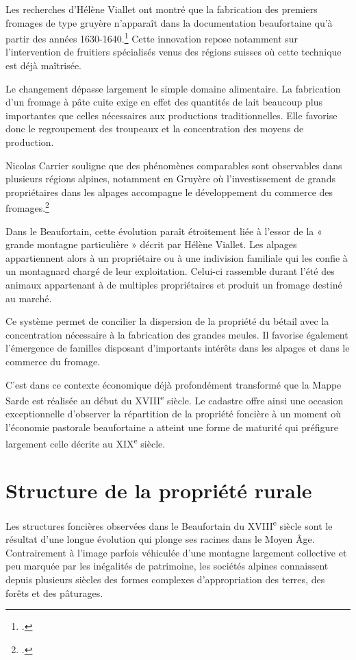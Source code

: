 \documentclass[12pt,a4paper]{report}
\begin{document}
Les recherches d'Hélène Viallet ont montré que la fabrication des premiers fromages de type gruyère n'apparaît dans la documentation beaufortaine qu'à partir des années 1630-1640.\footcite[96]{HViallet1993} Cette innovation repose notamment sur l'intervention de fruitiers spécialisés venus des régions suisses où cette technique est déjà maîtrisée.

Le changement dépasse largement le simple domaine alimentaire. La fabrication d'un fromage à pâte cuite exige en effet des quantités de lait beaucoup plus importantes que celles nécessaires aux productions traditionnelles. Elle favorise donc le regroupement des troupeaux et la concentration des moyens de production.

Nicolas Carrier souligne que des phénomènes comparables sont observables dans plusieurs régions alpines, notamment en Gruyère où l'investissement de grands propriétaires dans les alpages accompagne le développement du commerce des fromages.\footcite[287]{CarrierMouthon2010PaysansAlpes}

Dans le Beaufortain, cette évolution paraît étroitement liée à l'essor de la « grande montagne particulière » décrit par Hélène Viallet. Les alpages appartiennent alors à un propriétaire ou à une indivision familiale qui les confie à un montagnard chargé de leur exploitation. Celui-ci rassemble durant l'été des animaux appartenant à de multiples propriétaires et produit un fromage destiné au marché.

Ce système permet de concilier la dispersion de la propriété du bétail avec la concentration nécessaire à la fabrication des grandes meules. Il favorise également l'émergence de familles disposant d'importants intérêts dans les alpages et dans le commerce du fromage.

C'est dans ce contexte économique déjà profondément transformé que la Mappe Sarde est réalisée au début du XVIII\textsuperscript{e} siècle. Le cadastre offre ainsi une occasion exceptionnelle d'observer la répartition de la propriété foncière à un moment où l'économie pastorale beaufortaine a atteint une forme de maturité qui préfigure largement celle décrite au XIX\textsuperscript{e} siècle.

\section{Structure de la propriété rurale}

Les structures foncières observées dans le Beaufortain du XVIII\textsuperscript{e} siècle sont le résultat d'une longue évolution qui plonge ses racines dans le Moyen Âge. Contrairement à l'image parfois véhiculée d'une montagne largement collective et peu marquée par les inégalités de patrimoine, les sociétés alpines connaissent depuis plusieurs siècles des formes complexes d'appropriation des terres, des forêts et des pâturages.
\end{document}
